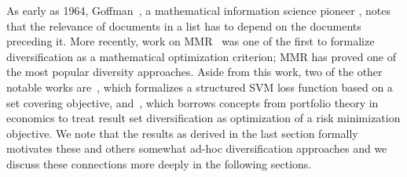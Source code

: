 As early as 1964, Goffman~\cite{goffman64OnRelevanceAsAMeasure}, a
mathematical information science pioneer \cite{harmon08RememberingWG},
notes that the relevance of documents in a list has to depend on the
documents preceding it.  More recently, work on
MMR~\cite{carbonell98MMR} was one of the first to formalize
diversification as a mathematical optimization criterion; MMR has
proved one of the most popular diversity approaches.  Aside from this
work, two of the other notable works are~\cite{yue081224Predicting},
which formalizes a structured SVM loss function based on a set
covering objective, and~\cite{wang09PortfolioTheory}, which borrows
concepts from portfolio theory in economics to treat result set
diversification as optimization of a risk minimization objective.  We
note that the results as derived in the last section formally motivates these and others somewhat ad-hoc diversification approaches and we discuss
these connections more deeply in the following sections.


